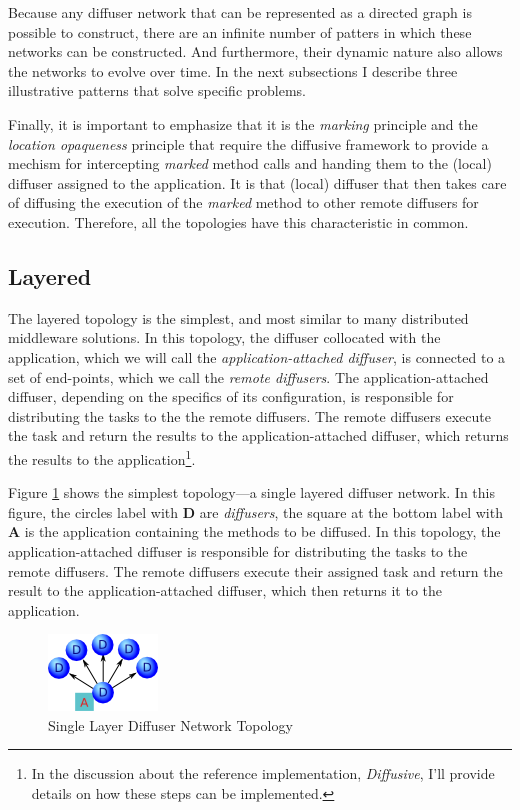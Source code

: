 \documentclass[11pt]{article}
\begin{document}
Because any diffuser network that can be represented as a directed graph is possible to construct, there are an infinite number of patters in which these networks can be constructed. And furthermore, their dynamic nature also allows the networks to evolve over time. In the next subsections I describe three illustrative patterns that solve specific problems.

Finally, it is important to emphasize that it is the \emph{marking} principle and the \emph{location opaqueness} principle that require the diffusive framework to provide a mechism for intercepting \emph{marked} method calls and handing them to the (local) diffuser assigned to the application. It is that (local) diffuser that then takes care of diffusing the execution of the \emph{marked} method to other remote diffusers for execution. Therefore, all the topologies have this characteristic in common.

\subsection{Layered}
The layered topology is the simplest, and most similar to many distributed middleware solutions. In this topology, the diffuser collocated with the application, which we will call the \emph{application-attached diffuser}, is connected to a set of end-points, which we call the \emph{remote diffusers}. The application-attached diffuser, depending on the specifics of its configuration, is responsible for distributing the tasks to the the remote diffusers. The remote diffusers execute the task and return the results to the application-attached diffuser, which returns the results to the application\footnote{In the discussion about the reference implementation, \emph{Diffusive}, I'll provide details on how these steps can be implemented.}. 

Figure \ref{fig:topology_single_layer} shows the simplest topology---a single layered diffuser network. In this figure, the circles label with \textbf{D} are \emph{diffusers}, the square at the bottom label with \textbf{A} is the application containing the methods to be diffused. In this topology, the application-attached diffuser is responsible for distributing the tasks to the remote diffusers. The remote diffusers execute their assigned task and return the result to the application-attached diffuser, which then returns it to the application.

\begin{figure}[htbp]
\begin{center}
\includegraphics[scale=1.0]{topology_single_layer}
\caption{Single Layer Diffuser Network Topology\label{fig:topology_single_layer}}
\end{center}
\end{figure}
\end{document}
